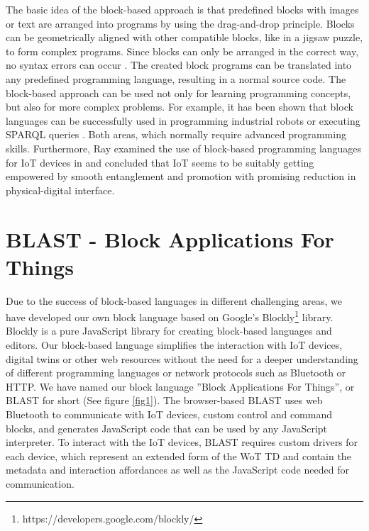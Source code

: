 \documentclass[runningheads]{llncs}
\begin{document}
The basic idea of the block-based approach is that predefined blocks with images or text are arranged into programs by using the drag-and-drop principle.
Blocks can be geometrically aligned with other compatible blocks, like in a jigsaw puzzle, to form complex programs.
Since blocks can only be arranged in the correct way, no syntax errors can occur \cite{10.11453341221} \cite{maloney2010scratch} \cite{10.1145/1089733.1089734} \cite{lye2014review}.
The created block programs can be translated into any predefined programming language, resulting in a normal source code. 
The block-based approach can be used not only for learning programming concepts, but also for more complex problems.
For example, it has been shown that block languages can be successfully used in programming industrial robots \cite{8120406} \cite{ghazal2016framework} \cite{tomlein2017visual} or executing SPARQL queries \cite{7369012}. Both areas, which normally require advanced programming skills. Furthermore, Ray examined the use of block-based programming languages for IoT devices in \cite{ray2017survey} and concluded that IoT seems to be suitably getting empowered by smooth entanglement and promotion with promising reduction in physical-digital interface. %

\section{BLAST - Block Applications For Things}
Due to the success of block-based languages in different challenging areas, we have developed our own block language based on Google's Blockly\footnote{https://developers.google.com/blockly/} library. %
Blockly is a pure JavaScript library for creating block-based languages and editors.
Our block-based language simplifies the interaction with IoT devices, digital twins or other web resources without the need for a deeper understanding of different programming languages or network protocols such as Bluetooth or HTTP.
We have named our block language ''Block Applications For Things'', or BLAST for short (See figure \ref{fig1}).
The browser-based BLAST uses web Bluetooth to communicate with IoT devices, custom control and command blocks, and generates JavaScript code that can be used by any JavaScript interpreter.
To interact with the IoT devices, BLAST requires custom drivers for each device, which represent an extended form of the WoT TD %
 and contain the metadata and interaction affordances as well as the JavaScript code needed for communication.
\end{document}
